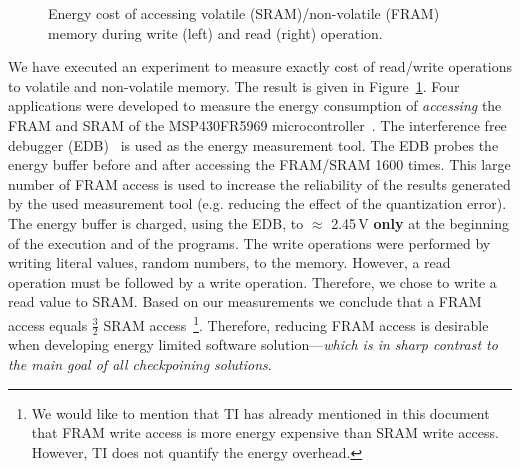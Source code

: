 \begin{figure}
	\centering
	\caption{Energy cost of accessing volatile (SRAM)/non-volatile (FRAM) memory during write (left) and read (right) operation.}
	\label{fig:framEnergy}
\end{figure}

We have executed an experiment to measure exactly cost of read/write operations to volatile and non-volatile memory. The result is given in Figure~\ref{fig:framEnergy}. Four applications were developed to measure the energy consumption of \emph{accessing} the FRAM and SRAM of the MSP430FR5969 microcontroller~\cite{msp430datasheet}. The interference free debugger (EDB)~\cite{edb} is used as the energy measurement tool. The EDB probes the energy buffer before and after accessing the FRAM/SRAM 1600 times. This large number of FRAM access is used to increase the reliability of the results generated by the used measurement tool (e.g. reducing the effect of the quantization error). The energy buffer is charged, using the EDB, to $\approx$ 2.45\,V \textbf{only} at the beginning of the execution and of the programs. The write operations were performed by writing literal values, random numbers, to the memory. However, a read operation must be followed by a write operation. Therefore, we chose to write a read value to SRAM. Based on our measurements we conclude that a FRAM access equals $\frac{3}{2}$ SRAM access~\footnote{We would like to mention that TI has already mentioned in this document~\cite{} that FRAM write access is more energy expensive than SRAM write access. However, TI does not quantify the energy overhead.}. Therefore, reducing FRAM access is desirable when developing energy limited software solution---\emph{which is in sharp contrast to the main goal of all checkpoining solutions}.

